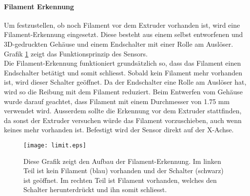 \vspace{3mm}
\label{sec:FilamentErkennung}
\paragraph{Filament Erkennung}
Um festzustellen, ob noch Filament vor dem Extruder vorhanden ist, wird eine Filament-Erkennung eingesetzt. Diese besteht aus einem selbst entworfenen und 3D-gedruckten Gehäuse und einem Endschalter mit einer Rolle am Auslöser. Grafik \ref{pic:FilamentErkennung} zeigt das Funktionsprinzip des Sensors.\\

Die Filament-Erkennung funktioniert grundsätzlich so, dass das Filament einen Endschalter betätigt und somit schliesst. Sobald kein Filament mehr vorhanden ist, wird dieser Schalter geöffnet. Da der Endschalter eine Rolle am Auslöser hat, wird so die Reibung mit dem Filament reduziert. Beim Entwerfen vom Gehäuse wurde darauf geachtet, dass Filament mit einem Durchmesser von 1.75 mm verwendet wird. Ausserdem sollte die Erkennung vor dem Extruder stattfinden, da sonst der Extruder versuchen würde das Filament vorzuschieben, auch wenn keines mehr vorhanden ist. Befestigt wird der Sensor direkt auf der X-Achse.

\begin{figure}[h]
	\centering
	\texttt{[image: limit.eps]}
	\caption{Diese Grafik zeigt den Aufbau der Filament-Erkennung. Im linken Teil ist kein Filament (blau) vorhanden und der Schalter (schwarz) ist geöffnet. Im rechten Teil ist Filament vorhanden, welches den Schalter herunterdrückt und ihn somit schliesst.}
	\label{pic:FilamentErkennung}
\end{figure}
